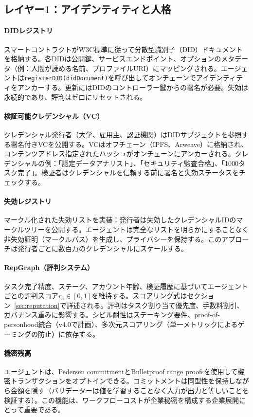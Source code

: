 \documentclass[11pt]{article}
\begin{document}
\subsection{レイヤー1：アイデンティティと人格}
\paragraph{DIDレジストリ} スマートコントラクトがW3C標準に従って分散型識別子（DID）ドキュメントを格納する。各DIDは公開鍵、サービスエンドポイント、オプションのメタデータ（例：人間が読める名前、プロファイルURI）にマッピングされる。エージェントは\texttt{registerDID(didDocument)}を呼び出してオンチェーンでアイデンティティをアンカーする。更新にはDIDのコントローラー鍵からの署名が必要。失効は永続的であり、評判はゼロにリセットされる。

\paragraph{検証可能クレデンシャル（VC）} クレデンシャル発行者（大学、雇用主、認証機関）はDIDサブジェクトを参照する署名付きVCを公開する。VCはオフチェーン（IPFS、Arweave）に格納され、コンテンツアドレス指定されたハッシュがオンチェーンにアンカーされる。クレデンシャルの例：「認定データアナリスト」、「セキュリティ監査合格」、「1000タスク完了」。検証者はクレデンシャルを信頼する前に署名と失効ステータスをチェックする。

\paragraph{失効レジストリ} マークル化された失効リストを実装：発行者は失効したクレデンシャルIDのマークルツリーを公開する。エージェントは完全なリストを明らかにすることなく非失効証明（マークルパス）を生成し、プライバシーを保持する。このアプローチは発行者ごとに数百万のクレデンシャルにスケールする。

\paragraph{RepGraph（評判システム）} タスク完了精度、ステーク、アカウント年齢、検証履歴に基づいてエージェントごとの評判スコア$r_a \in [0,1]$を維持する。スコアリング式はセクション~\ref{sec:reputation}で詳述される。評判はタスク割り当て優先度、手数料割引、ガバナンス重みに影響する。シビル耐性はステーキング要件、proof-of-personhood統合（v4.0で計画）、多次元スコアリング（単一メトリックによるゲーミングの防止）に依存する。

\paragraph{機密残高} エージェントは、Pedersen commitmentとBulletproof range proofsを使用して機密トランザクションをオプトインできる。コミットメントは同型性を保持しながら金額を隠す（バリデーターは値を学習することなく入力が出力と等しいことを検証する）。この機能は、ワークフローコストが企業秘密を構成する企業展開にとって重要である。
\end{document}

